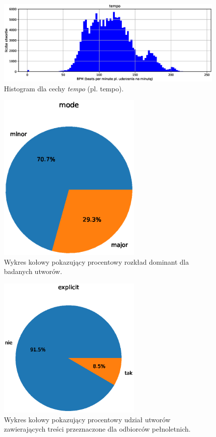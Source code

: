 \documentclass[a4paper,11pt]{article}
\begin{document}
    \smallskip

    \begin{figure}[H]
        \label{fig:tempo}
        \centering
        \includegraphics[width=\textwidth]{tempo}
        \caption{Histogram dla cechy \textit{tempo} (pl. tempo).}
    \end{figure}

    \smallskip

    \begin{figure}[H]
        \label{fig:mode}
        \centering
        \includegraphics[width=7cm,keepaspectratio]{mode}
        \caption{Wykres kołowy pokazujący procentowy rozkład dominant dla badanych utworów.}
    \end{figure}

    \smallskip

    \begin{figure}[H]
        \label{fig:explicit}
        \centering
        \includegraphics[width=7cm,keepaspectratio]{explicit}
        \caption{Wykres kołowy pokazujący procentowy udział utworów zawierających treści przeznaczone dla odbiorców pełnoletnich.}
    \end{figure}
\end{document}
